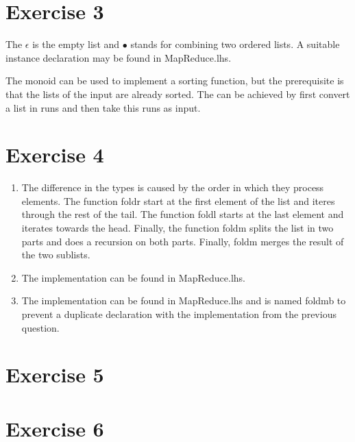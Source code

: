 \documentclass{article}
\begin{document}
\section*{Exercise 3}
The $\epsilon$ is the empty list and $\bullet$ stands for combining two ordered lists. A suitable instance declaration may be found in MapReduce.lhs.

The monoid can be used to implement a sorting function, but the prerequisite is that the lists of the input are already sorted. The can be achieved by first convert a list in runs and then take this runs as input.

\section*{Exercise 4}
\begin{enumerate}
  \item The difference in the types is caused by the order in which they process elements. The function foldr start at the first element of the list and iteres through the rest of the tail. The function foldl starts at the last element and iterates towards the head. Finally, the function foldm splits the list in two parts and does a recursion on both parts. Finally, foldm merges the result of the two sublists.
  \item The implementation can be found in MapReduce.lhs.
  \item The implementation can be found in MapReduce.lhs and is named foldmb to prevent a duplicate declaration with the implementation from the previous question.
\end{enumerate}
\section*{Exercise 5}
\section*{Exercise 6}
\end{document}
